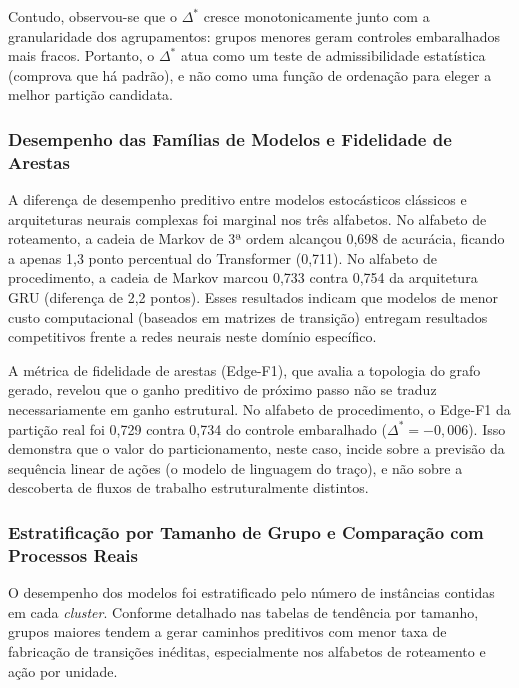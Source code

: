 


Contudo, observou-se que o $\Delta^*$ cresce monotonicamente junto com a granularidade dos agrupamentos: grupos menores geram controles embaralhados mais fracos. Portanto, o $\Delta^*$ atua como um teste de admissibilidade estatística (comprova que há padrão), e não como uma função de ordenação para eleger a melhor partição candidata.

\subsubsection{Desempenho das Famílias de Modelos e Fidelidade de Arestas}\label{sec:res-familias}

A diferença de desempenho preditivo entre modelos estocásticos clássicos e arquiteturas neurais complexas foi marginal nos três alfabetos. No alfabeto de roteamento, a cadeia de Markov de 3ª ordem alcançou 0,698 de acurácia, ficando a apenas 1,3 ponto percentual do Transformer (0,711). No alfabeto de procedimento, a cadeia de Markov marcou 0,733 contra 0,754 da arquitetura GRU (diferença de 2,2 pontos). Esses resultados indicam que modelos de menor custo computacional (baseados em matrizes de transição) entregam resultados competitivos frente a redes neurais neste domínio específico.

A métrica de fidelidade de arestas (Edge-F1), que avalia a topologia do grafo gerado, revelou que o ganho preditivo de próximo passo não se traduz necessariamente em ganho estrutural. No alfabeto de procedimento, o Edge-F1 da partição real foi 0,729 contra 0,734 do controle embaralhado ($\Delta^* = -0{,}006$). Isso demonstra que o valor do particionamento, neste caso, incide sobre a previsão da sequência linear de ações (o modelo de linguagem do traço), e não sobre a descoberta de fluxos de trabalho estruturalmente distintos.

\subsubsection{Estratificação por Tamanho de Grupo e Comparação com Processos Reais}\label{sec:res-tamanho}

O desempenho dos modelos foi estratificado pelo número de instâncias contidas em cada \emph{cluster}. Conforme detalhado nas tabelas de tendência por tamanho, grupos maiores tendem a gerar caminhos preditivos com menor taxa de fabricação de transições inéditas, especialmente nos alfabetos de roteamento e ação por unidade. 


